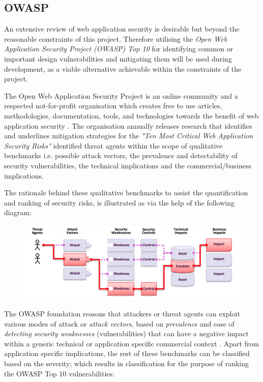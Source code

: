 \subsection{OWASP}

An extensive review of web application security is desirable but beyond the reasonable constraints of this project. Therefore  utilising the \textit{Open Web Application Security Project (OWASP) Top 10} \cite{OWASP2017} for identifying common or important design vulnerabilities and mitigating them will be used during development, as a viable alternative achievable within the constraints of the project.

The Open Web Application Security Project is an online community  and  a respected  not-for-profit organisation which creates free to use articles, methodologies, documentation, tools, and technologies towards the benefit of web application security \cite{OWASP}. The organisation  annually releases research that identifies and underlines mitigation strategies for the \textit{"Ten Most Critical Web Application Security Risks"}\cite{OWASP2017} identified threat agents within the scope of qualitative benchmarks i.e. possible attack vectors, the prevalence and detectability of security vulnerabilities, the technical implications and the commercial/business implications.

The rationale behind these qualitative benchmarks to assist the quantification and ranking of security risks,  is illustrated as via the help of the following diagram:

\begin{figure}[H]
	\centering
	\includegraphics[scale=0.5]{figures/attack}
	\label{fig:Consideration of Threat Agents}
\end{figure}

The OWASP foundation reasons \cite{OWASP2017} that attackers or threat agents can exploit various modes of attack or \textit{attack vectors}, based on \textit{prevalence} and ease of \textit{detecting security weaknesses} (vulnerabilities) that can have a negative impact  within a generic technical or application specific commercial context \cite{OWASP2017}. Apart from application specific implications, the rest of these benchmarks can be classified based on the severity; which results in classification for the purpose of ranking the OWASP Top 10 vulnerabilities:

